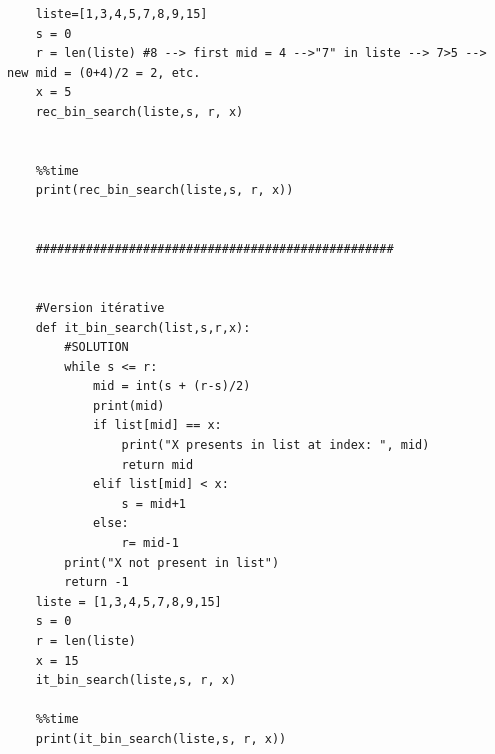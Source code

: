 \begin{Exercice}[20 minutes]
\begin{verbatim}
    liste=[1,3,4,5,7,8,9,15]
    s = 0
    r = len(liste) #8 --> first mid = 4 -->"7" in liste --> 7>5 --> new mid = (0+4)/2 = 2, etc.
    x = 5
    rec_bin_search(liste,s, r, x)
    
    
    %%time
    print(rec_bin_search(liste,s, r, x))
    
    
    ##################################################
    
    
    #Version itérative
    def it_bin_search(list,s,r,x):
        #SOLUTION
        while s <= r: 
            mid = int(s + (r-s)/2) 
            print(mid)
            if list[mid] == x:
                print("X presents in list at index: ", mid)
                return mid
            elif list[mid] < x: 
                s = mid+1
            else:
                r= mid-1
        print("X not present in list")
        return -1
    liste = [1,3,4,5,7,8,9,15]
    s = 0
    r = len(liste)
    x = 15
    it_bin_search(liste,s, r, x)
    
    %%time
    print(it_bin_search(liste,s, r, x))
    \end{verbatim}
\end{Exercice}



